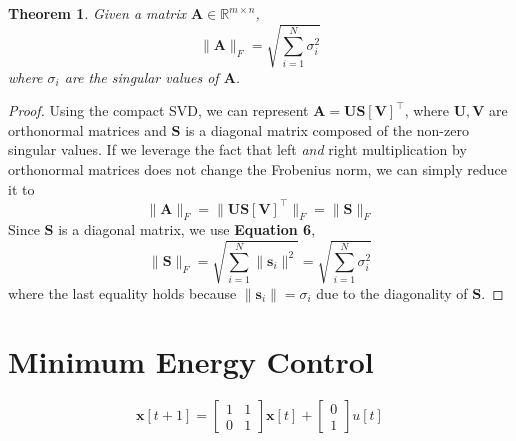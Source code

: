 \documentclass[]{article}
\newtheorem{genthm}{Theorem}
\newcommand{\tpose}[1]{\left[#1\right]^{\! \top} \!\!}
\begin{document}
\subsection{}

\begin{genthm}
Given a matrix \(\bm{A} \in \mathbb{R}^{m \times n}\),
\begin{equation}
	\|\bm{A}\|_F = \sqrt{\sum_{i = 1}^N \sigma^2_i}
\end{equation}
where \(\sigma_i\) are the singular values of \(\bm{A}\).
\end{genthm}

\begin{proof}
Using the compact SVD, we can represent \(\bm{A} = \bm{US} \tpose{\bm{V}}\), where \(\bm{U}, \bm{V}\) are orthonormal matrices and \(\bm{S}\) is a diagonal matrix composed of the non-zero singular values.
If we leverage the fact that left \emph{and} right multiplication by orthonormal matrices does not change the Frobenius norm, we can simply reduce it to
\begin{equation}
	\|\bm{A}\|_F = \|\bm{US} \tpose{\bm{V}}\|_F = \|\bm{S}\|_F
\end{equation}
Since \(\bm{S}\) is a diagonal matrix, we use \textbf{Equation 6},
\begin{equation}
	\|\bm{S}\|_F = \sqrt{\sum_{i = 1}^N \|\bm{s}_i\|^2} = \sqrt{\sum_{i = 1}^N \sigma^2_i}
\end{equation}
where the last equality holds because \(\|\bm{s}_i\| = \sigma_i\) due to the diagonality of \(\bm{S}\).
\end{proof}

\section{Minimum Energy Control}

\begin{equation}
	\bm{x}[t + 1] = \begin{bmatrix}
	1 & 1 \\
	0 & 1
	\end{bmatrix} \bm{x}[t] + \begin{bmatrix}
	0 \\
	1
	\end{bmatrix} u[t]
\end{equation}

\subsection{}
\end{document}
